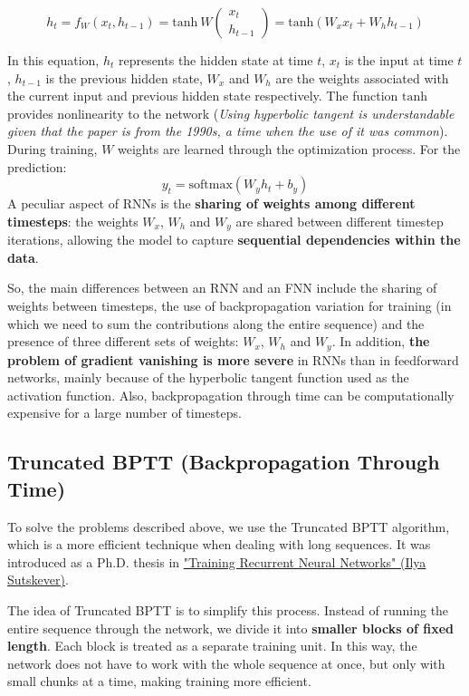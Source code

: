 $$
h_t = f_W(x_t,h_{t-1}) = \text{tanh} \ W \begin{pmatrix}
x_t \\
h_{t-1}
\end{pmatrix} = \text{tanh}(W_xx_t + W_hh_{t-1})
$$

In this equation, $h_t$ represents the hidden state at time $t$, $x_t$ is the input at time $t$, $h_{t-1}$ is the previous hidden state, $W_x$ and $W_h$ are the weights associated with the current input and previous hidden state respectively. The function $\text{tanh}$ provides nonlinearity to the network (\textit{Using hyperbolic tangent is understandable given that the paper is from the 1990s, a time when the use of it was common}). During training, $W$ weights are learned through the optimization process. For the prediction:
$$
y_t = \text{softmax}(W_y h_t + b_y)
$$
A peculiar aspect of RNNs is the \textbf{sharing of weights among different timesteps}: the weights $W_x$, $W_h$ and $W_y$ are shared between different timestep iterations, allowing the model to capture \textbf{sequential dependencies within the data}.

So, the main differences between an RNN and an FNN include the sharing of weights between timesteps, the use of backpropagation variation for training (in which we need to sum the contributions along the entire sequence) and the presence of three different sets of weights: $W_x$, $W_h$ and $W_y$. In addition, \textbf{the problem of gradient vanishing is more severe} in RNNs than in feedforward networks, mainly because of the hyperbolic tangent function used as the activation function. Also, backpropagation through time can be computationally expensive for a large number of timesteps.


\subsection{Truncated BPTT (Backpropagation Through Time)}


To solve the problems described above, we use the Truncated BPTT algorithm, which is a more efficient technique when dealing with long sequences. It was introduced as a Ph.D. thesis in \href{https://www.cs.utoronto.ca/~ilya/pubs/ilya_sutskever_phd_thesis.pdf}{"Training Recurrent Neural Networks" (Ilya Sutskever)}.

The idea of Truncated BPTT is to simplify this process. Instead of running the entire sequence through the network, we divide it into \textbf{smaller blocks of fixed length}. Each block is treated as a separate training unit. In this way, the network does not have to work with the whole sequence at once, but only with small chunks at a time, making training more efficient.

